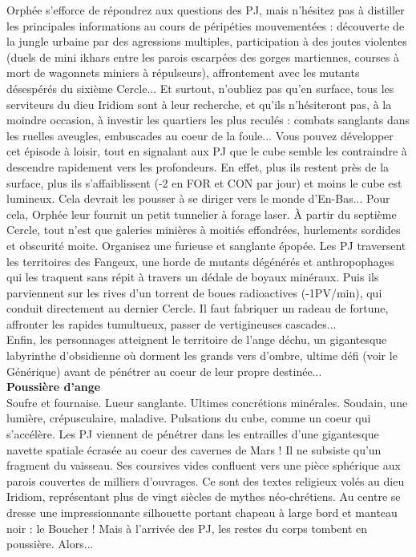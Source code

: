 \documentclass[11pt,twoside,a4paper]{book}
\begin{document}
Orph{\'e}e s'efforce de r{\'e}pondrez aux questions des PJ, mais n'h{\'e}sitez pas {\`a} distiller les principales informations au cours de p{\'e}rip{\'e}ties mouvement{\'e}es : d{\'e}couverte de la jungle urbaine par des agressions multiples, participation {\`a} des joutes violentes (duels de mini ikhars entre les parois escarp{\'e}es des gorges martiennes, courses {\`a} mort de wagonnets miniers {\`a} r{\'e}pulseurs), affrontement avec les mutants d{\'e}sesp{\'e}r{\'e}s du sixi{\`e}me Cercle... Et surtout, n'oubliez pas qu'en surface, tous les serviteurs du dieu Iridiom sont {\`a} leur recherche, et qu'ils n'h{\'e}siteront pas, {\`a} la moindre occasion, {\`a} investir les quartiers les plus recul{\'e}s : combats sanglants dans les ruelles aveugles, embuscades au coeur de la foule... Vous pouvez d{\'e}velopper cet {\'e}pisode {\`a} loisir, tout en signalant aux PJ que le cube semble les contraindre {\`a} descendre rapidement vers les profondeurs. En effet, plus ils restent pr{\`e}s de la surface, plus ils s'affaiblissent (-2 en FOR et CON par jour) et moins le cube est lumineux. Cela devrait les pousser {\`a} se diriger vers le monde d'En-Bas... Pour cela, Orph{\'e}e leur fournit un petit tunnelier {\`a} forage laser. {\`A} partir du septi{\`e}me Cercle, tout n'est que galeries mini{\`e}res {\`a} moiti{\'e}s effondr{\'e}es, hurlements sordides et obscurit{\'e} moite. Organisez une furieuse et sanglante {\'e}pop{\'e}e. Les PJ traversent les territoires des Fangeux, une horde de mutants d{\'e}g{\'e}n{\'e}r{\'e}s et anthropophages qui les traquent sans r{\'e}pit {\`a} travers un d{\'e}dale de boyaux min{\'e}raux. Puis ils parviennent sur les rives d'un torrent de boues radioactives (-1PV/min), qui conduit directement au dernier Cercle. Il faut fabriquer un radeau de fortune, affronter les rapides tumultueux, passer de vertigineuses cascades...~\\

Enfin, les personnages atteignent le territoire de l'ange d{\'e}chu, un gigantesque labyrinthe d'obsidienne o{\`u} dorment les grands vers d'ombre, ultime d{\'e}fi (voir le G{\'e}n{\'e}rique) avant de p{\'e}n{\'e}trer au coeur de leur propre destin{\'e}e...~\\

\textbf{\large Poussi{\`e}re d'ange}~\\

Soufre et fournaise. Lueur sanglante. Ultimes concr{\'e}tions min{\'e}rales. Soudain, une lumi{\`e}re, cr{\'e}pusculaire, maladive. Pulsations du cube, comme un coeur qui s'acc{\'e}l{\`e}re. Les PJ viennent de p{\'e}n{\'e}trer dans les entrailles d'une gigantesque navette spatiale {\'e}cras{\'e}e au coeur des cavernes de Mars ! Il ne subsiste qu'un fragment du vaisseau. Ses coursives vides confluent vers une pi{\`e}ce sph{\'e}rique aux parois couvertes de milliers d'ouvrages. Ce sont des textes religieux vol{\'e}s au dieu Iridiom, repr{\'e}sentant plus de vingt si{\`e}cles de mythes n{\'e}o-chr{\'e}tiens. Au centre se dresse une impressionnante silhouette portant chapeau {\`a} large bord et manteau noir : le Boucher ! Mais {\`a} l'arriv{\'e}e des PJ, les restes du corps tombent en poussi{\`e}re. Alors...~\\
\end{document}
